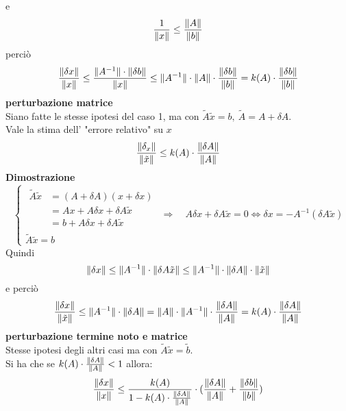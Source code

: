 e
\begin{equation*}
\frac{1}{\lVert x\rVert} \le \frac{\lVert A\rVert}{\lVert b\rVert}
\end{equation*}
perciò
\begin{equation*}
\frac{\lVert\delta x\rVert}{\lVert x\rVert}\leq \frac{\lVert A^{-1}\rVert\cdot\lVert\delta b\rVert}{\lVert x\rVert}\leq \lVert A^{-1}\rVert\cdot\lVert A\rVert\cdot\frac{\lVert\delta b\rVert}{\lVert b\rVert}=k(A)\cdot\frac{\lVert\delta b\rVert}{\lVert b\rVert}
\end{equation*}
\textbf{ perturbazione matrice}\\
Siano fatte le stesse ipotesi del caso 1, ma con $\tilde{A} \tilde{x} = b, \ \tilde{A} = A + \delta A$.\\
Vale la stima dell' "errore relativo" su $x$
\[
\frac{\lVert\delta_x\rVert}{\lVert\tilde{x}\rVert} \le k(A) \cdot \frac{\lVert\delta A\rVert}{\lVert A\rVert}
\]
\textbf{Dimostrazione}
\[
\begin{cases}
\begin{split}
\tilde{A}\tilde{x} & =(A+\delta A)(x+\delta x)\\
& = Ax + A\delta x + \delta A\tilde{x}\\
& = b + A\delta x + \delta A\tilde{x}
\end{split}\\
\tilde{A}\tilde{x} = b
\end{cases}
\Rightarrow \quad A\delta x + \delta A\tilde{x}=0 \iff \delta x=-A^{-1} (\delta A\tilde{x})
\]
Quindi
\[
\lVert\delta x\rVert \le \lVert A^{-1}\rVert \cdot \lVert\delta A \tilde{x}\rVert \le \lVert A^{-1}\rVert \cdot \lVert\delta A\rVert \cdot \lVert\tilde{x}\rVert
\]
e perciò
\[
\frac{\lVert\delta x\rVert}{\lVert\tilde{x}\rVert} \le \lVert A^{-1}\rVert \cdot \lVert\delta A\rVert = \lVert A\rVert \cdot \lVert A^{-1}\rVert \cdot \frac{\lVert\delta A\rVert}{\lVert A\rVert} = k(A) \cdot \frac{\lVert\delta A\rVert}{\lVert A\rVert}
\]
\textbf{ perturbazione termine noto e matrice}\\
Stesse ipotesi degli altri casi ma con $\tilde{A}\tilde{x}=\tilde{b}$.\\
Si ha che se $k(A) \cdot \frac{\lVert\delta A\rVert}{\lVert A\rVert}<1$ allora:
\[
\begin{split}
\frac{\lVert\delta x\rVert}{\lVert x\rVert} \le \frac{k(A)}{1 - k(A) \cdot \frac{\lVert\delta A\rVert}{\lVert A\rVert}} \cdot (\frac{\lVert\delta A\rVert}{\lVert A\rVert} + \frac{\lVert\delta b\rVert}{\lVert b\rVert})
\end{split}
\]